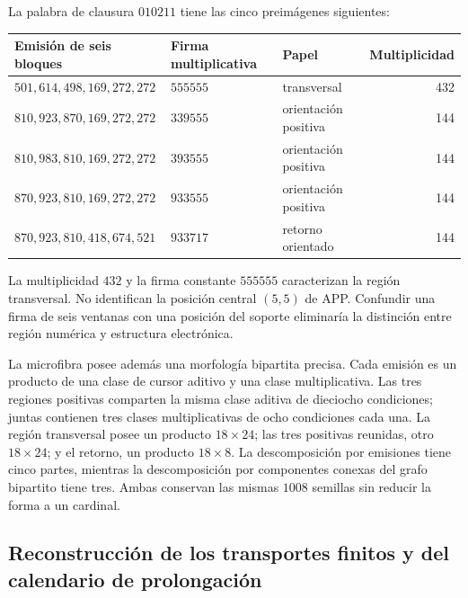 La palabra de clausura \(010211\) tiene las cinco preimágenes siguientes:
\begin{center}\small
\begin{tabular}{@{}lll r@{}}\toprule
Emisión de seis bloques&Firma multiplicativa&Papel&Multiplicidad\\\midrule
\(501,614,498,169,272,272\)&\(555555\)&transversal&432\\
\(810,923,870,169,272,272\)&\(339555\)&orientación positiva&144\\
\(810,983,810,169,272,272\)&\(393555\)&orientación positiva&144\\
\(870,923,810,169,272,272\)&\(933555\)&orientación positiva&144\\
\(870,923,810,418,674,521\)&\(933717\)&retorno orientado&144\\\bottomrule
\end{tabular}
\end{center}
La multiplicidad \(432\) y la firma constante \(555555\) caracterizan la región transversal. No identifican la posición central \((5,5)\) de APP. Confundir una firma de seis ventanas con una posición del soporte eliminaría la distinción entre región numérica y estructura electrónica.

La microfibra posee además una morfología bipartita precisa. Cada emisión es un producto de una clase de cursor aditivo y una clase multiplicativa. Las tres regiones positivas comparten la misma clase aditiva de dieciocho condiciones; juntas contienen tres clases multiplicativas de ocho condiciones cada una. La región transversal posee un producto \(18\times24\); las tres positivas reunidas, otro \(18\times24\); y el retorno, un producto \(18\times8\). La descomposición por emisiones tiene cinco partes, mientras la descomposición por componentes conexas del grafo bipartito tiene tres. Ambas conservan las mismas \(1008\) semillas sin reducir la forma a un cardinal.





\subsection{Reconstrucción de los transportes finitos y del calendario de prolongación}

